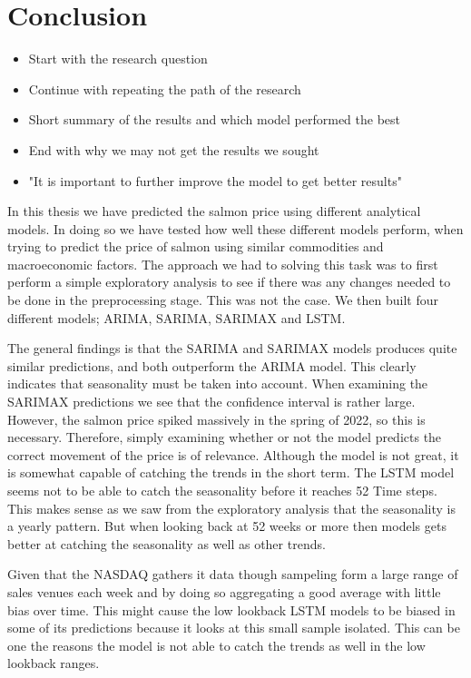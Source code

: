 \section{Conclusion}
\begin{itemize}
    \item Start with the research question
    \item Continue with repeating the path of the research
    \item Short summary of the results and which model performed the best
    \item End with why we may not get the results we sought
    \item "It is important to further improve the model to get better results"
\end{itemize}

In this thesis we have predicted the salmon price using different analytical models. In doing so we have tested how well these different models perform, when trying to predict the price of salmon using similar commodities and macroeconomic factors. The approach we had to solving this task was to first perform a simple exploratory analysis to see if there was any changes needed to be done in the preprocessing stage. This was not the case. We then built four different models; ARIMA, SARIMA, SARIMAX and LSTM.

The general findings is that the SARIMA and SARIMAX models produces quite similar predictions, and both outperform the ARIMA model. This clearly indicates that seasonality must be taken into account. When examining the SARIMAX predictions we see that the confidence interval is rather large. However, the salmon price spiked massively in the spring of 2022, so this is necessary. Therefore, simply examining whether or not the model predicts the correct movement of the price is of relevance. Although the model is not great, it is somewhat capable of catching the trends in the short term. The LSTM model seems not to be able to catch the seasonality before it reaches 52 Time steps. This makes sense as we saw from the exploratory analysis that the seasonality is a yearly pattern. But when looking back at 52 weeks or more then models gets better at catching the seasonality as well as other trends.

Given that the NASDAQ gathers it data though sampeling form a large range of sales venues each week and by doing so aggregating a good average with little bias over time. This might cause the low lookback LSTM models to be biased in some of its predictions because it looks at this small sample isolated. This can be one the reasons the model is not able to catch the trends as well in the low lookback ranges.

